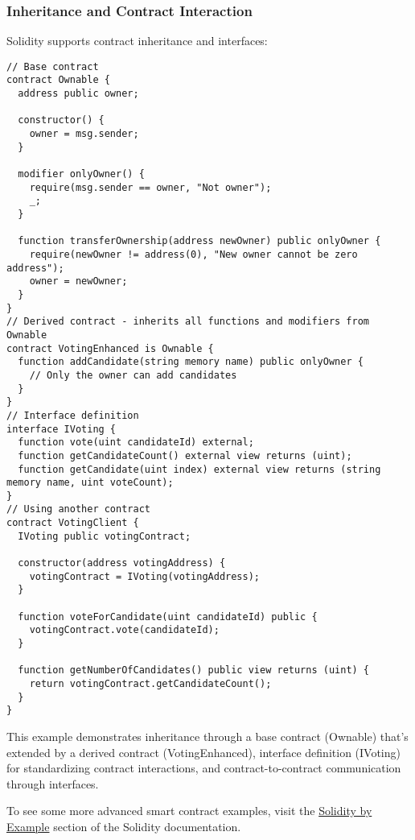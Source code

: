 \documentclass[12pt]{article}
\begin{document}
\noindent
\begin{minipage}[c]{\textwidth}
  \subsubsection*{Inheritance and Contract Interaction}
  Solidity supports contract inheritance and interfaces:

  \begin{lstlisting}[language=Solidity]
// Base contract
contract Ownable {
  address public owner;

  constructor() {
    owner = msg.sender;
  }

  modifier onlyOwner() {
    require(msg.sender == owner, "Not owner");
    _;
  }

  function transferOwnership(address newOwner) public onlyOwner {
    require(newOwner != address(0), "New owner cannot be zero address");
    owner = newOwner;
  }
}
// Derived contract - inherits all functions and modifiers from Ownable
contract VotingEnhanced is Ownable {
  function addCandidate(string memory name) public onlyOwner {
    // Only the owner can add candidates
  }
}
// Interface definition
interface IVoting {
  function vote(uint candidateId) external;
  function getCandidateCount() external view returns (uint);
  function getCandidate(uint index) external view returns (string memory name, uint voteCount);
}
// Using another contract
contract VotingClient {
  IVoting public votingContract;
  
  constructor(address votingAddress) {
    votingContract = IVoting(votingAddress);
  }

  function voteForCandidate(uint candidateId) public {
    votingContract.vote(candidateId);
  }

  function getNumberOfCandidates() public view returns (uint) {
    return votingContract.getCandidateCount();
  }
}
\end{lstlisting}
\end{minipage}

\noindent
This example demonstrates inheritance through a base contract (Ownable) that's extended by a derived contract (VotingEnhanced), interface definition (IVoting) for standardizing contract interactions, and contract-to-contract communication through interfaces.

\medskip
\noindent
To see some more advanced smart contract examples, visit the \href{https://docs.soliditylang.org/en/latest/solidity-by-example.html}{Solidity by Example} section of the Solidity documentation.
\end{document}
